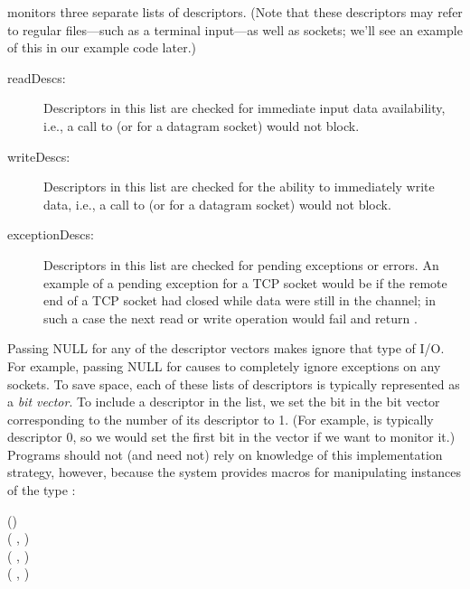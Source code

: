 \noindent
{} monitors three separate lists of
descriptors.  (Note that these descriptors may refer to regular
files---such as a terminal input---as well as sockets; we'll see an
example of this in our example code later.)
%
\begin{description}
\item[readDescs:] Descriptors in this list are checked for
immediate input data availability, i.e., a call to
 (or  for a datagram socket)
would not block.
\item[writeDescs:] Descriptors in this list are checked for the
ability to immediately write data, i.e., a call to
 (or  for a datagram socket) would not block.
\item[exceptionDescs:] Descriptors in this list are checked for
pending exceptions or errors.  An example of a pending exception for a
TCP socket would be if the remote end of a TCP socket had closed while
data were still in the channel; in such a case the next read or write operation
would fail and return .
\end{description}
%
Passing NULL for any of the descriptor vectors makes
 ignore that type of I/O.  For example, passing
NULL for  causes  to
completely ignore exceptions on any sockets.
%
To save space, each of these lists of descriptors is typically
represented as a \emph{bit vector}. To include a descriptor in the list, we
set the bit in the bit vector corresponding to the number of its
descriptor to 1.  (For example,  is typically descriptor 0,
so we would set the first bit in the vector if we want to monitor it.)
Programs should not (and need not) rely on knowledge of this
implementation strategy, however, because the system provides macros
for manipulating instances of the type :

\begin{inlinefcn}
()\\
( , )\\ 
( , )\\ 
( , ) 
\end{inlinefcn}

